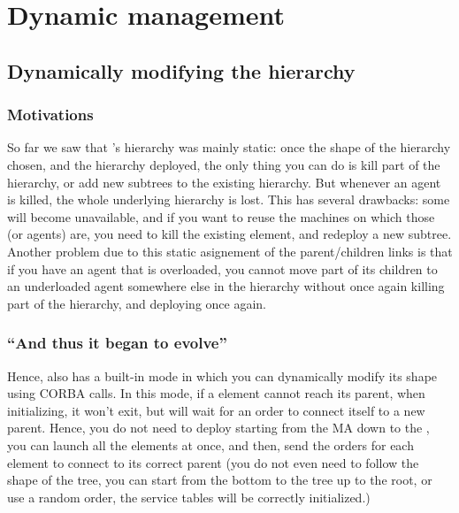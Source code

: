 

\chapter{Dynamic management}
\label{ch:dynamic}

\section{Dynamically modifying the hierarchy}

\subsection{Motivations}

So far we saw that \diet's hierarchy was mainly static: once the shape
of the hierarchy chosen, and the hierarchy deployed, the only thing
you can do is kill part of the hierarchy, or add new subtrees to the
existing hierarchy. But whenever an agent is killed, the whole
underlying hierarchy is lost. This has several drawbacks: some \sed
will become unavailable, and if you want to reuse the machines on
which those \sed (or agents) are, you need to kill the existing \diet
element, and redeploy a new subtree. Another problem due to this
static asignement of the parent/children links is that if you have an
agent that is overloaded, you cannot move part of its children to an
underloaded agent somewhere else in the hierarchy without once again
killing part of the hierarchy, and deploying once again.


\subsection{``And thus it began to evolve''}

Hence, \diet also has a built-in mode in which you can dynamically modify
its shape using CORBA calls.  In this mode, if a \diet element
cannot reach its parent, when initializing, it won't exit, but will
wait for an order to connect itself to a new parent. Hence, you do not
need to deploy \diet starting from the MA down to the \sed, you can
launch all the elements at once, and then, send the orders for each
element to connect to its correct parent (you do not even need to
follow the shape of the tree, you can start from the bottom to the
tree up to the root, or use a random order, the service tables will be
correctly initialized.)

